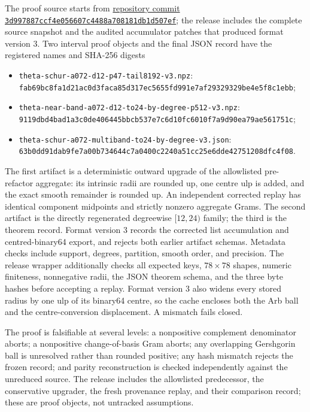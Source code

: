 \documentclass[10pt]{article}
\begin{document}
The proof source starts from
\href{https://github.com/lluiseriksson/riemann-prime-resolvent/tree/3d997887ccf4e056607c4488a708181db1d507ef}
{repository commit \texttt{3d997887ccf4e056607c4488a708181db1d507ef}};
the release includes the complete source snapshot and the audited accumulator
patches that produced format version 3.
Two interval proof objects and the final JSON record have the
registered names and SHA-256 digests
\begin{itemize}\small
\item \nolinkurl{theta-schur-a072-d12-p47-tail8192-v3.npz}:\\
\texttt{fab69bc8fa1d21ac0d3faca85d317ec5655fd991e7af29329329be4e5f8c1ebb};
\item \nolinkurl{theta-near-band-a072-d12-to24-by-degree-p512-v3.npz}:\\
\texttt{9119dbd4bad1a3c0de406445bbcb537e7c6d10fc6010f7a9d90ea79ae561751c};
\item \nolinkurl{theta-schur-a072-multiband-to24-by-degree-v3.json}:\\
\texttt{63b0dd91dab9fe7a00b734644c7a0400c2240a51cc25e6dde42751208dfc4f08}.
\end{itemize}
The first artifact is a deterministic outward upgrade of the allowlisted
pre-refactor aggregate: its intrinsic radii are rounded up, one centre ulp is
added, and the exact smooth remainder is rounded up.  An independent corrected
replay has identical component midpoints and strictly nonzero aggregate Grams.
The second artifact is the directly regenerated degreewise $[12,24)$ family;
the third is the theorem record.  Format version 3 records the corrected list accumulation and
centred-binary64 export, and rejects both earlier artifact schemas.
Metadata checks include support, degrees, partition, smooth order, and
precision.  The release wrapper additionally checks all expected keys,
$78\times78$ shapes, numeric finiteness, nonnegative radii, the JSON theorem
schema, and the three byte hashes before accepting a replay.  Format version 3
also widens every stored radius by one ulp of its binary64 centre, so the cache
encloses both the Arb ball and the centre-conversion displacement.  A mismatch
fails closed.

The proof is falsifiable at several levels: a nonpositive complement
denominator aborts; a nonpositive change-of-basis Gram aborts; any overlapping
Gershgorin ball is unresolved rather than rounded positive; any hash mismatch
rejects the frozen record; and parity reconstruction is checked independently
against the unreduced source.  The release includes the allowlisted predecessor,
the conservative upgrader, the fresh provenance replay, and their comparison
record; these are proof objects, not untracked assumptions.
\end{document}
